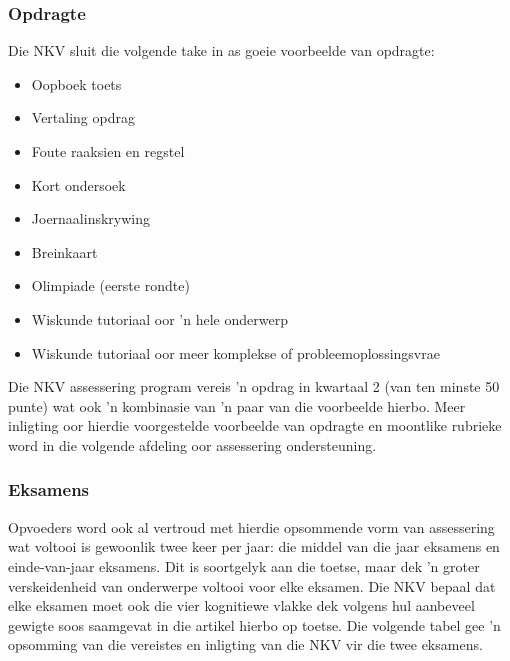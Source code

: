 \subsubsection{Opdragte}
Die NKV sluit die volgende take in as goeie voorbeelde van opdragte:
\begin{itemize}[noitemsep]
\item
  Oopboek toets
\item
  Vertaling opdrag
\item
  Foute raaksien en regstel
\item
  Kort ondersoek
\item
  Joernaalinskrywing
\item
  Breinkaart
\item
  Olimpiade (eerste rondte)
\item
  Wiskunde tutoriaal oor 'n hele onderwerp
\item
  Wiskunde tutoriaal oor meer komplekse of probleemoplossingsvrae
\end{itemize}
Die NKV assessering program vereis 'n opdrag in kwartaal 2 (van ten minste 50 punte) wat ook 'n kombinasie van 'n paar van die voorbeelde hierbo. Meer inligting oor hierdie voorgestelde voorbeelde van opdragte en moontlike rubrieke word in die volgende afdeling oor assessering ondersteuning.

\subsubsection{Eksamens}
Opvoeders word ook al vertroud met hierdie opsommende vorm van assessering wat voltooi is gewoonlik twee keer per jaar: die middel van die jaar eksamens en einde-van-jaar eksamens. Dit is soortgelyk aan die toetse, maar dek 'n groter verskeidenheid van onderwerpe voltooi voor elke eksamen. Die NKV bepaal dat elke eksamen moet ook die vier kognitiewe vlakke dek volgens hul aanbeveel gewigte soos saamgevat in die artikel hierbo op toetse. Die volgende tabel gee 'n opsomming van die vereistes en inligting van die NKV vir die twee eksamens.

